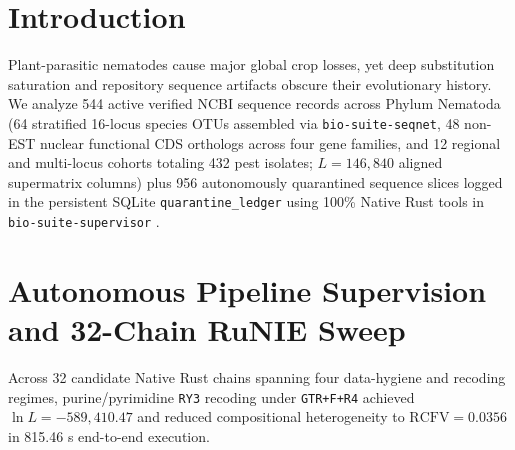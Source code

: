 \documentclass[10pt,letterpaper]{article}
\begin{document}
\section{Introduction}
Plant-parasitic nematodes cause major global crop losses, yet deep substitution saturation and repository sequence artifacts obscure their evolutionary history. We analyze 544 active verified NCBI sequence records across Phylum Nematoda (64 stratified 16-locus species OTUs assembled via \texttt{bio-suite-seqnet}, 48 non-EST nuclear functional CDS orthologs across four gene families, and 12 regional and multi-locus cohorts totaling 432 pest isolates; $L = 146,840$ aligned supermatrix columns) plus 956 autonomously quarantined sequence slices logged in the persistent SQLite \texttt{quarantine\_ledger} using 100\% Native Rust tools in \texttt{bio-suite-supervisor} \cite{ref1,ref2,ref3}.
\section{Autonomous Pipeline Supervision and 32-Chain RuNIE Sweep}
Across 32 candidate Native Rust chains spanning four data-hygiene and recoding regimes, purine/pyrimidine \texttt{RY3} recoding under \texttt{GTR+F+R4} achieved $\ln L = -589,410.47$ and reduced compositional heterogeneity to $\mathrm{RCFV} = 0.0356$ in 815.46 s end-to-end execution.
\end{document}
